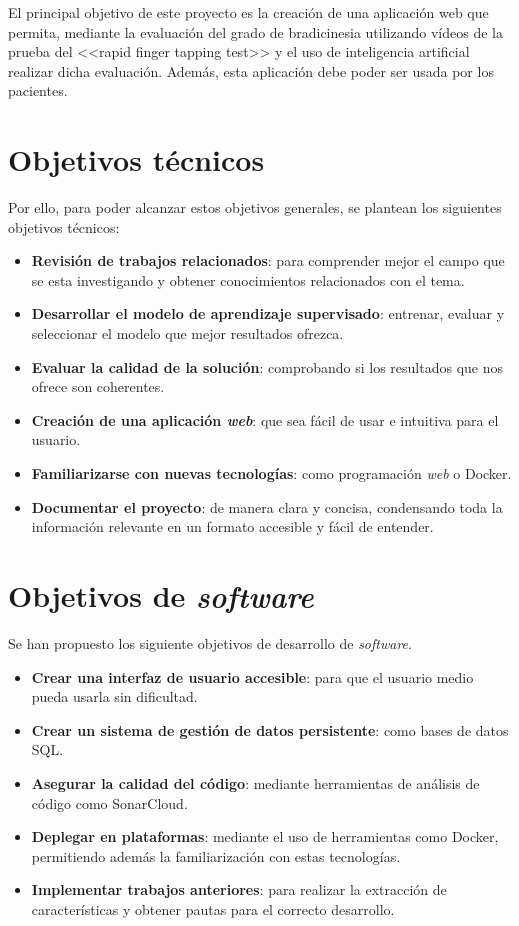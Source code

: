 
El principal objetivo de este proyecto es la creación de una aplicación web que permita, mediante la evaluación del grado de bradicinesia utilizando vídeos de la prueba del <<rapid finger tapping test>> y el uso de inteligencia artificial realizar dicha evaluación. Además, esta aplicación debe poder ser usada por los pacientes.


\section{Objetivos técnicos}

Por ello, para poder alcanzar estos objetivos generales, se plantean los siguientes objetivos técnicos:
\begin{itemize}
\item \textbf{Revisión de trabajos relacionados}: para comprender mejor el campo que se esta investigando y obtener conocimientos relacionados con el tema.
\item \textbf{Desarrollar el modelo de aprendizaje supervisado}: entrenar, evaluar y seleccionar el modelo que mejor resultados ofrezca.
\item \textbf{Evaluar la calidad de la solución}: comprobando si los resultados que nos ofrece son coherentes.
\item \textbf{Creación de una aplicación \textit{web}}: que sea fácil de usar e intuitiva para el usuario.
\item \textbf{Familiarizarse con nuevas tecnologías}: como programación \textit{web} o Docker.
\item \textbf{Documentar el proyecto}: de manera clara y concisa, condensando toda la información relevante en un formato accesible y fácil de entender.
\end{itemize}

\section{Objetivos de \textit{software}}

Se han propuesto los siguiente objetivos de desarrollo de \textit{software}.
\begin{itemize}
\item \textbf{Crear una interfaz de usuario accesible}: para que el usuario medio pueda usarla sin dificultad.
\item \textbf{Crear un sistema de gestión de datos persistente}: como bases de datos SQL.
\item \textbf{Asegurar la calidad del código}: mediante herramientas de análisis de código como SonarCloud.
\item \textbf{Deplegar en plataformas}: mediante el uso de herramientas como Docker, permitiendo además la familiarización con estas tecnologías.
\item \textbf{Implementar trabajos anteriores}: para realizar la extracción de características y obtener pautas para el correcto desarrollo.
\end{itemize}